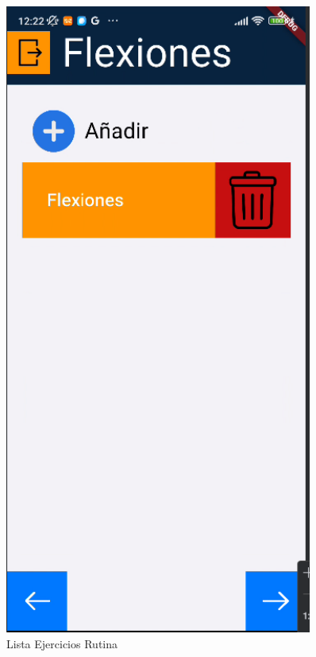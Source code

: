 \begin{figure}[H]
   \centering
   \begin{minipage}{0.45\textwidth}
      \centering
      \includegraphics[width=0.9\textwidth]{pantallas/listaEjerRutina.png}
      \caption{Lista Ejercicios Rutina}
      \label{fig:listaEjerRutina}
   \end{minipage}%
   \hspace{0.5cm}

\end{figure}
